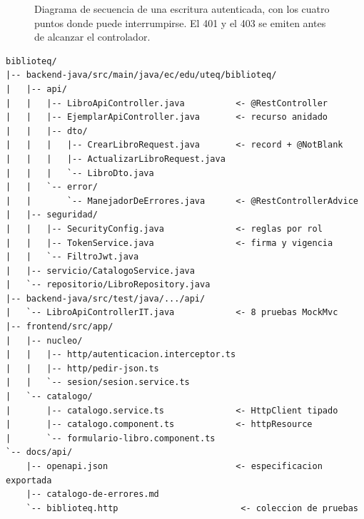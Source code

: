 \documentclass[11pt,a4paper,openany]{book}
\begin{document}
\begin{figure}[htbp]
	\caption{Diagrama de secuencia de una escritura autenticada, con los cuatro puntos donde puede interrumpirse. El 401 y el 403 se emiten antes de alcanzar el controlador.}
	\label{fig:u4:sec-jwt}
\end{figure}

\begin{lstlisting}[style=plano,caption={Estructura de archivos del ejercicio 4.C servidor y cliente.},label={lst:u4:arbol-4c}]
biblioteq/
|-- backend-java/src/main/java/ec/edu/uteq/biblioteq/
|   |-- api/
|   |   |-- LibroApiController.java          <- @RestController
|   |   |-- EjemplarApiController.java       <- recurso anidado
|   |   |-- dto/
|   |   |   |-- CrearLibroRequest.java       <- record + @NotBlank
|   |   |   |-- ActualizarLibroRequest.java
|   |   |   `-- LibroDto.java
|   |   `-- error/
|   |       `-- ManejadorDeErrores.java      <- @RestControllerAdvice
|   |-- seguridad/
|   |   |-- SecurityConfig.java              <- reglas por rol
|   |   |-- TokenService.java                <- firma y vigencia
|   |   `-- FiltroJwt.java
|   |-- servicio/CatalogoService.java
|   `-- repositorio/LibroRepository.java
|-- backend-java/src/test/java/.../api/
|   `-- LibroApiControllerIT.java            <- 8 pruebas MockMvc
|-- frontend/src/app/
|   |-- nucleo/
|   |   |-- http/autenticacion.interceptor.ts
|   |   |-- http/pedir-json.ts
|   |   `-- sesion/sesion.service.ts
|   `-- catalogo/
|       |-- catalogo.service.ts              <- HttpClient tipado
|       |-- catalogo.component.ts            <- httpResource
|       `-- formulario-libro.component.ts
`-- docs/api/
    |-- openapi.json                         <- especificacion exportada
    |-- catalogo-de-errores.md
    `-- biblioteq.http                        <- coleccion de pruebas
\end{lstlisting}
\end{document}
